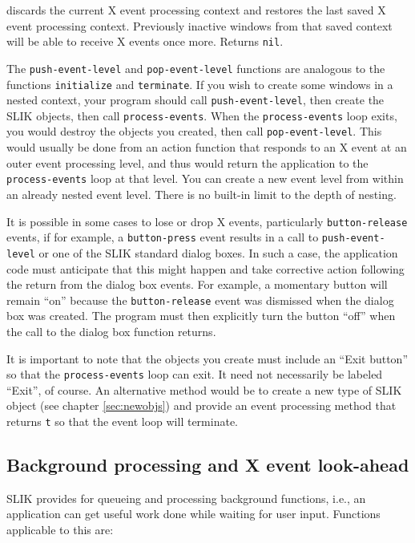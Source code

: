 \documentclass[twoside,openright,11pt]{report}
\newcommand{\tp}[1]{\texttt{#1}}
\begin{document}
{discards the current X event processing context and restores the last
saved X event processing context.  Previously inactive windows from
that saved context will be able to receive X events once more.
Returns \tp{nil}.}

The \tp{push-event-level} and \tp{pop-event-level} functions are
analogous to the functions \tp{initialize} and \tp{terminate}.  If you
wish to create some windows in a nested context, your program should
call \tp{push-event-level}, then create the SLIK objects, then call
\tp{process-events}.  When the \tp{process-events} loop exits, you
would destroy the objects you created, then call \tp{pop-event-level}.
This would usually be done from an action function that responds to an
X event at an outer event processing level, and thus would return the
application to the \tp{process-events} loop at that level.  You can
create a new event level from within an already nested event level.
There is no built-in limit to the depth of nesting.

It is possible in some cases to lose or drop X events, particularly
\tp{button-release} events, if for example, a \tp{button-press} event
results in a call to \tp{push-event-level} or one of the SLIK standard
dialog boxes.  In such a case, the application code must anticipate
that this might happen and take corrective action following the return
from the dialog box events.  For example, a momentary button will
remain ``on'' because the \tp{button-release} event was dismissed when
the dialog box was created.  The program must then explicitly turn the
button ``off'' when the call to the dialog box function returns.

It is important to note that the objects you create must include an
``Exit button'' so that the \tp{process-events} loop can exit.  It
need not necessarily be labeled ``Exit'', of course.  An alternative
method would be to create a new type of SLIK object (see chapter
\ref{sec:newobjs}) and provide an event processing method that returns
\tp{t} so that the event loop will terminate.

\subsection{Background processing and X event look-ahead}

SLIK provides for queueing and processing background functions, i.e.,
an application can get useful work done while waiting for user input.
Functions applicable to this are:
\end{document}
